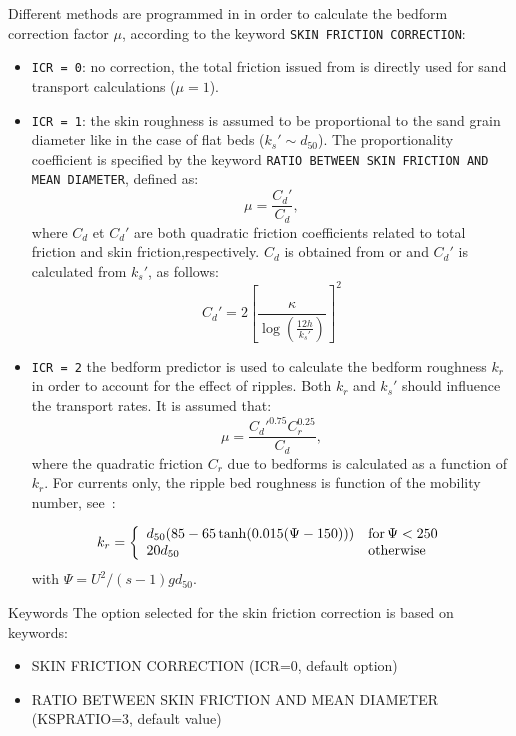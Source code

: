 Different methods are programmed in \sisyphe in order to calculate the bedform
correction factor $\mu$, according to the keyword \texttt{SKIN FRICTION CORRECTION}:

\begin{itemize}
\item \texttt{ICR = 0}: no correction, the total friction issued from
\tel is directly used for sand transport calculations ($\mu=1$).
\item \texttt{ICR = 1}: the skin roughness is assumed to be proportional
to the sand grain diameter like in the case of flat beds ($k_s' \sim d_{50}$). The proportionality coefficient is specified by the keyword \texttt{RATIO BETWEEN SKIN FRICTION AND MEAN DIAMETER}, defined as:
\begin{equation}\label{eq:icr1}
\mu =\frac{C_d'}{C_d}, 
\end{equation}
where $C_d$ et $C_d'$ are both quadratic friction coefficients related to total friction and skin friction,respectively. $C_d$ is obtained from \teldd or \telddd
and $C_d'$ is calculated from $k_s'$, as follows:
\begin{equation}\label{eq:ksp}
C_d' = 2\left[\frac{\kappa}{\log(\frac{12h}{k_s'})}\right]^2 
\end{equation}
\item \texttt{ICR = 2} the bedform predictor is used to calculate the
bedform roughness $k_r$ in order to account for the effect of ripples. Both $k_r$
and $k_s'$ should influence the transport rates. It is assumed that:
\begin{equation}\label{eq:mu}
\mu =\frac{C_d'^{0.75} C_r^{0.25}}{C_d}, 
\end{equation}
where the quadratic friction $C_r$ due to bedforms is calculated as a
function of $k_r$. For currents only, the ripple bed roughness is function of the mobility number, see~\cite{vanRijn07}:

\begin{equation*}
k_r =\left\{\begin{array}{ll}
d_{50}(85-65\tanh(0.015(\Psi-150))) & \text{for\,} \Psi<250\\
20 d_{50} & \text{otherwise} 
\end{array}
\right.
\end{equation*}
with $\Psi =U^2/(s-1)gd_{50}$.
\end{itemize}

\medskip
\begin{bclogo}[couleur=blue!10,arrondi=0.1, logo=\bcinfo]{Keywords}
The option selected for the skin friction correction is based on keywords:
\begin{itemize}
\item {\ttfamily SKIN FRICTION CORRECTION} ({\ttfamily ICR=0}, default option)
\item {\ttfamily RATIO BETWEEN SKIN FRICTION AND MEAN DIAMETER} ({\ttfamily KSPRATIO=3}, default value)
\end{itemize}
\end{bclogo}

